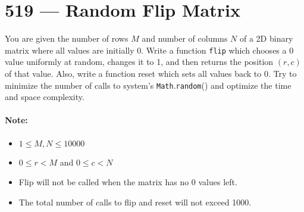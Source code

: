 \section{519 --- Random Flip Matrix}
You are given the number of rows $M$ and number of columns $N$ of a 2D binary matrix where all values are initially 0. Write a function \texttt{flip} which chooses a 0 value uniformly at random, changes it to 1, and then returns the position $(r,c)$ of that value. Also, write a function reset which sets all values back to 0. Try to minimize the number of calls to system's \texttt{Math}.\texttt{random}() and optimize the time and space complexity.

\paragraph{Note:}

\begin{itemize}
\item $1 \leq M, N \leq 10000$
\item $0\leq r < M$ and $0\leq c < N$
\item Flip will not be called when the matrix has no 0 values left.
\item The total number of calls to flip and reset will not exceed 1000.
\end{itemize}

